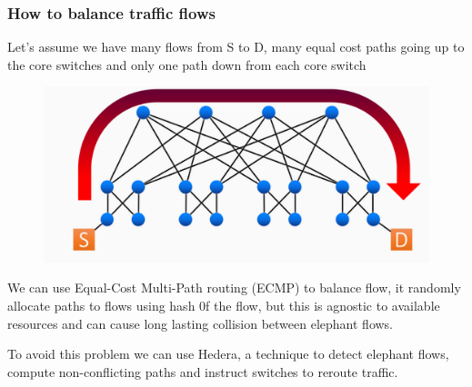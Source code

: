         \subsubsection{How to balance traffic flows}
        Let's assume we have many flows from S to D, many equal cost paths going up to the core switches and only one path down from each core switch
        \begin{figure}[h!]
            \centering
            \includegraphics[scale=0.25]{images/trafficflow1.png}
        \end{figure}    
        We can use Equal-Cost Multi-Path routing (ECMP) to balance flow, it randomly allocate paths to flows using hash 0f the flow, but this is agnostic to available resources and can cause long lasting collision between elephant flows.
        
        To avoid this problem we can use Hedera, a technique to detect elephant flows, compute non-conflicting paths and instruct switches to reroute traffic.
    
